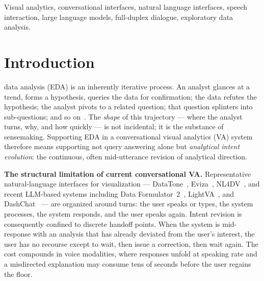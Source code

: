 \documentclass[journal]{IEEEtran}
\begin{document}
\begin{IEEEkeywords}
Visual analytics, conversational interfaces, natural language interfaces, speech interaction, large language models, full-duplex dialogue, exploratory data analysis.
\end{IEEEkeywords}

\section{Introduction}
\label{sec:intro}
 data analysis (EDA) is an inherently iterative process. An analyst glances at a trend, forms a hypothesis, queries the data for confirmation; the data refutes the hypothesis; the analyst pivots to a related question; that question splinters into sub-questions; and so on~\cite{pirolli2005sensemaking,kandel2012enterprise}. The \emph{shape} of this trajectory --- where the analyst turns, why, and how quickly --- is not incidental; it is the substance of sensemaking. Supporting EDA in a conversational visual analytics (VA) system therefore means supporting not query answering alone but \emph{analytical intent evolution}: the continuous, often mid-utterance revision of analytical direction.

\textbf{The structural limitation of current conversational VA.}
Representative natural-language interfaces for visualization --- DataTone~\cite{gao2015datatone}, Eviza~\cite{setlur2016eviza}, NL4DV~\cite{narechania2020nl4dv}, and recent LLM-based systems including Data Formulator~2~\cite{wang2025dataformulator2}, LightVA~\cite{zhao2024lightva}, and DashChat~\cite{cheng2025dashchat} --- are organized around turns: the user speaks or types, the system processes, the system responds, and the user speaks again. Intent revision is consequently confined to discrete handoff points. When the system is mid-response with an analysis that has already deviated from the user's interest, the user has no recourse except to wait, then issue a correction, then wait again. The cost compounds in voice modalities, where responses unfold at speaking rate and a misdirected explanation may consume tens of seconds before the user regains the floor.
\end{document}
